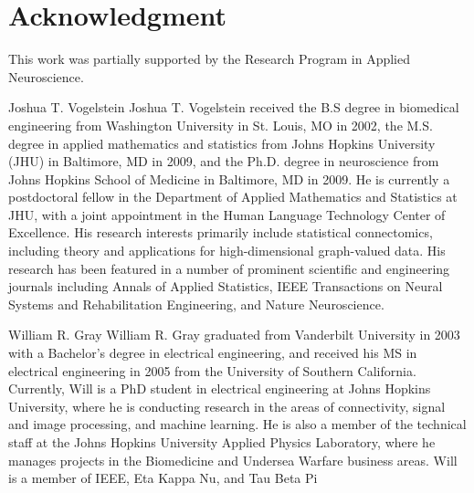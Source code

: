 \documentclass[10pt,journal,cspaper,compsoc]{IEEEtran}
\begin{document}
  \section*{Acknowledgment}
\fi

This work was partially supported by the Research Program in Applied Neuroscience. 

\ifCLASSOPTIONcaptionsoff
  \newpage
\fi





\begin{IEEEbiographynophoto}{Joshua T. Vogelstein}
Joshua T. Vogelstein received the B.S degree in biomedical engineering from Washington University in St. Louis, MO in 2002, the M.S. degree in applied mathematics and statistics from Johns Hopkins University (JHU) in Baltimore, MD in 2009, and the Ph.D. degree in neuroscience from Johns Hopkins School of Medicine in Baltimore, MD in 2009.  He is currently a postdoctoral fellow in the Department of Applied Mathematics and Statistics at JHU, with a joint appointment in the Human Language Technology Center of Excellence.  His research interests primarily include statistical connectomics, including theory and applications for high-dimensional graph-valued data. His research has been featured in a number of prominent scientific and engineering journals including Annals of Applied Statistics, IEEE Transactions on Neural Systems and Rehabilitation Engineering, and Nature Neuroscience.
\end{IEEEbiographynophoto}

\begin{IEEEbiographynophoto}{William R. Gray}
William R. Gray graduated from Vanderbilt University in 2003 with a Bachelor’s degree in electrical engineering, and received his MS in electrical engineering in 2005 from the University of Southern California.  Currently, Will is a PhD student in electrical engineering at Johns Hopkins University, where he is conducting research in the areas of connectivity, signal and image processing, and machine learning.  He is also a member of the technical staff at the Johns Hopkins University Applied Physics Laboratory, where he manages projects in the Biomedicine and Undersea Warfare business areas.  Will is a member of IEEE, Eta Kappa Nu, and Tau Beta Pi
\end{IEEEbiographynophoto}
\end{document}
